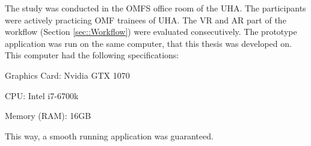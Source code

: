 The study was conducted in the OMFS office room of the UHA.
The participants were actively practicing OMF trainees of UHA.
The VR and AR part of the workflow (Section \ref{sec::Workflow}) were evaluated consecutively.
The prototype application was run on the same computer, that this 
thesis was developed on.
This computer had the following specifications:

\begin{compactenum}[label=(\alph*)]
    \item Graphics Card: Nvidia GTX 1070
    \item CPU: Intel i7-6700k
    \item Memory (RAM): 16GB
\end{compactenum}

This way, a smooth running application was guaranteed.

